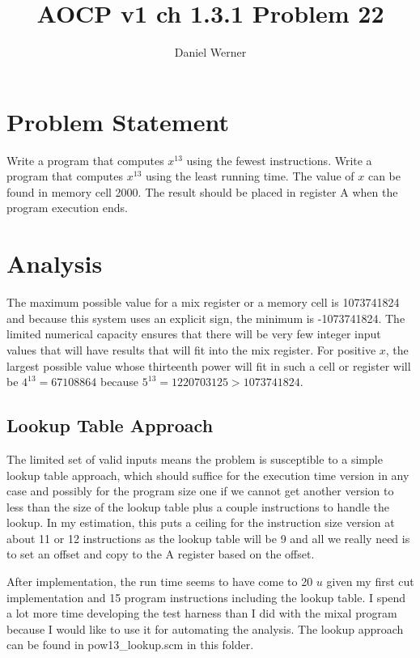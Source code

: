 \documentclass{article}
\title{AOCP v1 ch 1.3.1 Problem 22}
\author{Daniel Werner}
\begin{document}
\maketitle

\section*{
    Problem Statement
}

Write a program that computes $x^{13}$ using the fewest instructions.  Write a
program that computes $x^{13}$ using the least running time.  The value of $x$
can be found in memory cell 2000.  The result should be placed in register A
when the program execution ends.

\section {
    Analysis
}

The maximum possible value for a mix register or a memory cell
is 1073741824 and because this system uses an explicit sign,
the minimum is -1073741824.  The limited numerical capacity ensures
that there will be very few integer input values that will have
results that will fit into the mix register.  For positive $x$, the largest
possible value whose thirteenth power will fit in such a cell
or register will be $4^{13}=67108864$ because $5^{13}=1220703125 >
1073741824$.

\subsection {
  Lookup Table Approach
}
The limited set of valid inputs means the problem is susceptible to a
simple lookup table approach, which should suffice for the
execution time version in any case and possibly for the
program size one if we cannot get another version to less
than the size of the lookup table plus a couple instructions
to handle the lookup.  In my estimation, this puts a ceiling
for the instruction size version at about 11 or 12 instructions
as the lookup table will be 9 and all we really need is to
set an offset and copy to the A register based on the offset.

\par

After implementation, the run time seems to have come to 20 $u$ given my
first cut implementation and 15 program instructions including the
lookup table.  I spend a lot more time developing the
test harness than I did with the mixal program because I would like
to use it for automating the analysis.  The lookup approach can be
found in pow13\_lookup.scm in this folder.
\end{document}

